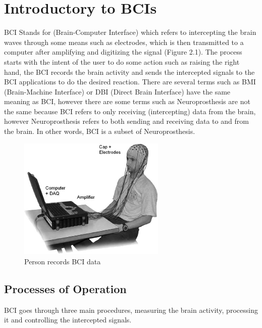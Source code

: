 \section{Introductory to BCIs}
BCI Stands for (Brain-Computer Interface) which refers to intercepting the brain waves through some means such as electrodes, which is then transmitted to a computer after amplifying and digitizing the signal (Figure 2.1). The process starts with the intent of the user to do some action such as raising the right hand, the BCI records the brain activity and sends the intercepted signals to the BCI applications to do the desired reaction. There are several terms such as BMI (Brain-Machine Interface) or DBI (Direct Brain Interface) have the same meaning as BCI, however there are some terms such as Neuroprosthesis are not the same because BCI refers to only receiving (intercepting) data from the brain, however Neuroprosthesis refers to both sending and receiving data to and from the brain. In other words, BCI is a subset of Neuroprosthesis.
\begin{figure}
    \centering
    \includegraphics[width=70mm]{images/figure-2-1.jpg}
    \caption{Person records BCI data}
    \label{fig:my_label}
\end{figure}


\subsection{Processes of Operation}
BCI goes through three main procedures, measuring the brain activity, processing it and controlling the intercepted signals.
